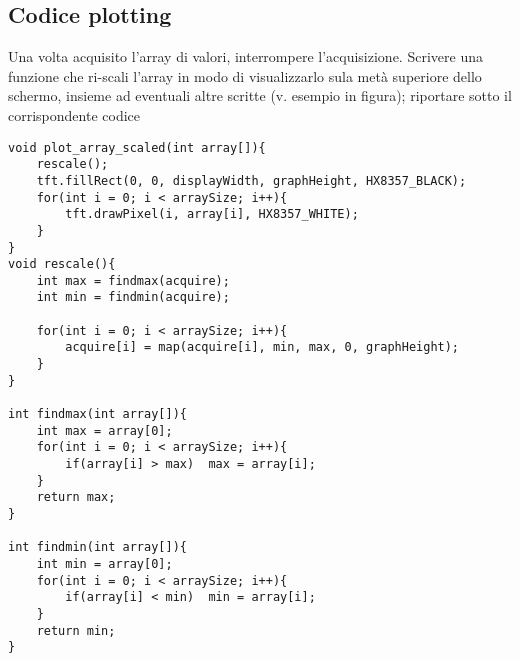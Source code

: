 \subsection{Codice plotting}
Una volta acquisito l’array di valori, interrompere l’acquisizione. Scrivere una funzione che ri-scali l’array in modo di visualizzarlo sula metà superiore dello schermo, insieme ad eventuali altre scritte (v. esempio in figura); riportare sotto il corrispondente codice
\begin{lstlisting}[frame=single, language=Arduino]
void plot_array_scaled(int array[]){
    rescale();
    tft.fillRect(0, 0, displayWidth, graphHeight, HX8357_BLACK);
    for(int i = 0; i < arraySize; i++){
        tft.drawPixel(i, array[i], HX8357_WHITE);
    }
}
void rescale(){
    int max = findmax(acquire);
    int min = findmin(acquire);

    for(int i = 0; i < arraySize; i++){
        acquire[i] = map(acquire[i], min, max, 0, graphHeight);
    }
}

int findmax(int array[]){
    int max = array[0];
    for(int i = 0; i < arraySize; i++){
        if(array[i] > max)  max = array[i];
    }
    return max;
}

int findmin(int array[]){
    int min = array[0];
    for(int i = 0; i < arraySize; i++){
        if(array[i] < min)  min = array[i];
    }
    return min;
}
\end{lstlisting}